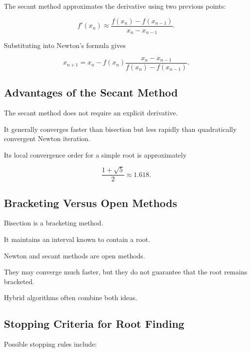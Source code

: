 The secant method approximates the derivative using two previous points:

\[
f'(x_n)
\approx
\frac{
f(x_n)-f(x_{n-1})
}{
x_n-x_{n-1}
}.
\]

Substituting into Newton's formula gives

\[
\boxed{
x_{n+1}
=
x_n
-
f(x_n)
\frac{
x_n-x_{n-1}
}{
f(x_n)-f(x_{n-1})
}.
}
\]

\subsection{Advantages of the Secant Method}
\label{subsec:secant-advantages}

The secant method does not require an explicit derivative.

It generally converges faster than bisection but less rapidly than
quadratically convergent Newton iteration.

Its local convergence order for a simple root is approximately

\[
\boxed{
\frac{
1+\sqrt{5}
}{
2
}
\approx1.618.
}
\]

\subsection{Bracketing Versus Open Methods}
\label{subsec:bracketing-versus-open}

Bisection is a bracketing method.

It maintains an interval known to contain a root.

Newton and secant methods are open methods.

They may converge much faster, but they do not guarantee that the root
remains bracketed.

Hybrid algorithms often combine both ideas.

\subsection{Stopping Criteria for Root Finding}
\label{subsec:root-stopping-criteria}

Possible stopping rules include:

